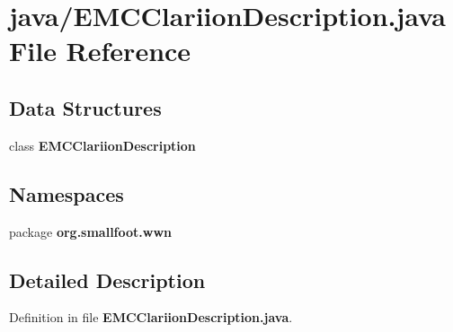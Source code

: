 \section{java/\-E\-M\-C\-Clariion\-Description.java \-File \-Reference}
\label{EMCClariionDescription_8java}
\subsection*{\-Data \-Structures}
\begin{DoxyCompactItemize}
\item 
class {\bf \-E\-M\-C\-Clariion\-Description}
\end{DoxyCompactItemize}
\subsection*{\-Namespaces}
\begin{DoxyCompactItemize}
\item 
package {\bf org.\-smallfoot.\-wwn}
\end{DoxyCompactItemize}


\subsection{\-Detailed \-Description}


\-Definition in file {\bf \-E\-M\-C\-Clariion\-Description.\-java}.

